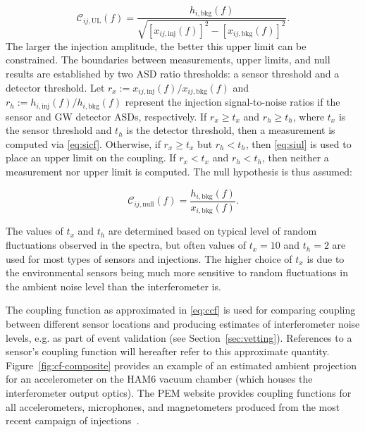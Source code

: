 \begin{equation}\label{eq:siul}
	\mathcal{C}_{ij, \mathrm{UL}}(f) = \frac{h_{i,\textrm{bkg}}(f)}{\sqrt{[x_{ij,\textrm{inj}}(f)]^2 - [x_{ij,\textrm{bkg}}(f)]^2}}.
\end{equation}
The larger the injection amplitude, the better this upper limit can be constrained.
The boundaries between measurements, upper limits, and null results are established by two \ac{ASD} ratio thresholds: a sensor threshold and a detector threshold.
Let $r_x := x_{ij,\textrm{inj}}(f) / x_{ij,\textrm{bkg}}(f)$ and $r_h := h_{i,\textrm{inj}}(f) / h_{i,\textrm{bkg}}(f)$ represent the injection signal-to-noise ratios if the sensor and \ac{GW} detector \acp{ASD}, respectively.
If $r_x \geq t_x$ and $r_h \geq t_h$, where $t_x$ is the sensor threshold and $t_h$ is the detector threshold, then a measurement is computed via \cref{eq:sicf}.
Otherwise, if $r_x \geq t_x$ but $r_h < t_h$, then \cref{eq:siul} is used to place an upper limit on the coupling.
If $r_x < t_x$ and $r_h < t_h$, then neither a measurement nor upper limit is computed.
The null hypothesis is thus assumed:

\begin{equation}\label{eq:sinull}
	\mathcal{C}_{ij, \mathrm{null}}(f) = \frac{h_{i,\textrm{bkg}}(f)}{x_{i,\textrm{bkg}}(f)}.
\end{equation}

The values of $t_x$ and $t_h$ are determined based on typical level of random fluctuations observed in the spectra, but often values of $t_x = 10$ and $t_h = 2$ are used for most types of sensors and injections.
The higher choice of $t_x$ is due to the environmental sensors being much more sensitive to random fluctuations in the ambient noise level than the interferometer is.

The coupling function as approximated in \cref{eq:ccf} is used for comparing coupling between different sensor locations and producing estimates of interferometer noise levels, e.g. as part of event validation (see Section~\ref{sec:vetting}).
References to a sensor's coupling function will hereafter refer to this approximate quantity.
Figure~\ref{fig:cf-composite} provides an example of an estimated ambient projection for an accelerometer on the HAM6 vacuum chamber (which houses the interferometer output optics).
The \ac{PEM} website provides coupling functions for all accelerometers, microphones, and magnetometers produced from the most recent campaign of injections~\citep{PEM_website}.

